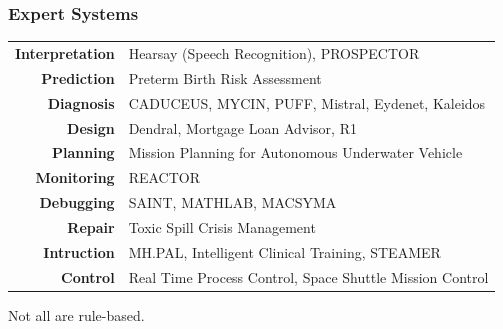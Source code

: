 \documentclass[xcolor={usenames,dvipsnames,svgnames}, compress]{beamer}
\begin{document}



\begin{frame}
  \frametitle{Expert Systems}
  \begin{table}[htbp]
    \centering
    \begin{tabular}{r l}
      \textbf{Interpretation} & Hearsay (Speech Recognition), PROSPECTOR\\
      \textbf{Prediction} & Preterm Birth Risk Assessment \\
      \textbf{Diagnosis} & CADUCEUS, MYCIN, PUFF, Mistral, Eydenet, Kaleidos\\
      \textbf{Design} & Dendral, Mortgage Loan Advisor, R1\\
      \textbf{Planning} & Mission Planning for Autonomous Underwater Vehicle\\
      \textbf{Monitoring} & REACTOR\\
      \textbf{Debugging} & SAINT, MATHLAB, MACSYMA\\
      \textbf{Repair} & Toxic Spill Crisis Management\\
      \textbf{Intruction} & MH.PAL, Intelligent Clinical Training, STEAMER\\
      \textbf{Control} & Real Time Process Control, Space Shuttle Mission Control\\
      
      
    \end{tabular}
  \end{table}
  
  Not all are rule-based.
\end{frame}
\end{document}
